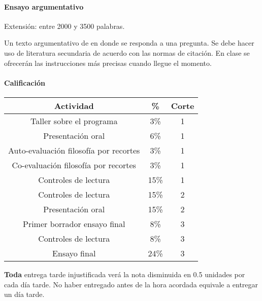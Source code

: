 \documentclass[spanish,]{article}
\let\oldparagraph\paragraph
\renewcommand{\paragraph}[1]{\oldparagraph{#1}\mbox{}}
\begin{document}
\paragraph{\texorpdfstring{\textbf{Ensayo
argumentativo}}{Ensayo argumentativo}}\label{ensayo-argumentativo}

Extensión: entre 2000 y 3500 palabras.

Un texto argumentativo de en donde se responda a una pregunta. Se debe
hacer uso de literatura secundaria de acuerdo con las normas de
citación. En clase se ofrecerán las instrucciones más precisas cuando
llegue el momento.

\paragraph{\texorpdfstring{\textbf{Calificación}}{Calificación}}\label{calificacion}

\begin{tabular}{|c|c|c|}
\hline
\textbf{Actividad} & \textbf{\%} & \textbf{Corte}\\
\hline
Taller sobre el programa & 3\% & 1\\
\hline
Presentación oral & 6\% & 1\\
\hline
Auto-evaluación filosofía por recortes & 3\% & 1\\
\hline
Co-evaluación filosofía por recortes & 3\% & 1\\
\hline
Controles de lectura & 15\% & 1\\
\hline
Controles de lectura & 15\% & 2\\
\hline
Presentación oral & 15\% & 2\\
\hline
Primer borrador ensayo final & 8\% & 3\\
\hline
Controles de lectura & 8\% & 3\\
\hline
Ensayo final & 24\% & 3\\
\hline
\end{tabular}

\textbf{Toda} entrega tarde injustificada verá la nota disminuida en 0.5
unidades por cada día tarde. No haber entregado antes de la hora
acordada equivale a entregar un día tarde.
\end{document}
